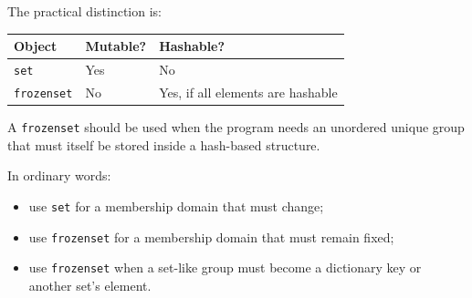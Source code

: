 The practical distinction is:

\begin{center}
\begin{tabular}{lll}
\textbf{Object} & \textbf{Mutable?} & \textbf{Hashable?} \\
\hline
\texttt{set} & Yes & No \\
\texttt{frozenset} & No & Yes, if all elements are hashable \\
\end{tabular}
\end{center}

A \texttt{frozenset} should be used when the program needs an unordered unique group that must itself be stored inside a hash-based structure.

In ordinary words:

\begin{itemize}
    \item use \texttt{set} for a membership domain that must change;
    \item use \texttt{frozenset} for a membership domain that must remain fixed;
    \item use \texttt{frozenset} when a set-like group must become a dictionary key or another set's element.
\end{itemize}